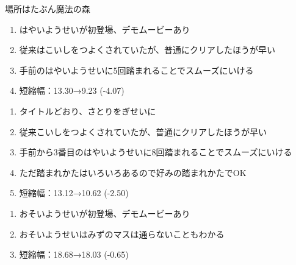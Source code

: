 場所はたぶん魔法の森



\begin{enumerate}[label={\sarrow}]
\item はやいようせいが初登場、デモムービーあり
\item 従来はこいしをつよくされていたが、普通にクリアしたほうが早い
\item 手前のはやいようせいに5回踏まれることでスムーズにいける
\item 短縮幅：13.30→9.23 (-4.07)
\end{enumerate}



\begin{enumerate}[label={\sarrow}]
\item タイトルどおり、さとりをぎせいに
\item 従来こいしをつよくされていたが、普通にクリアしたほうが早い
\item 手前から3番目のはやいようせいに8回踏まれることでスムーズにいける
\item ただ踏まれかたはいろいろあるので好みの踏まれかたでOK
\item 短縮幅：13.12→10.62 (-2.50)
\end{enumerate}



\begin{enumerate}[label={\sarrow}]
\item おそいようせいが初登場、デモムービーあり
\item おそいようせいはみずのマスは通らないこともわかる
\item 短縮幅：18.68→18.03 (-0.65)
\end{enumerate}



